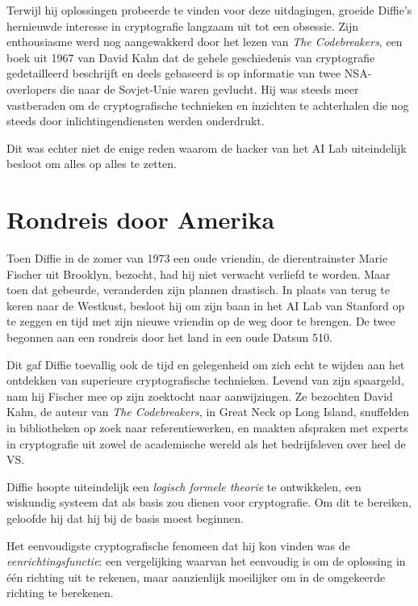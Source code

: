 \documentclass[
  a5paper,
  smalldemyvopaper,11pt,twoside,onecolumn,openright,extrafontsizes]{memoir}
\begin{document}
Terwijl hij oplossingen probeerde te vinden voor deze uitdagingen,
groeide Diffie's hernieuwde interesse in cryptografie langzaam uit tot
een obsessie. Zijn enthousiasme werd nog aangewakkerd door het lezen van
\emph{The Codebreakers}, een boek uit 1967 van David Kahn dat de gehele
geschiedenis van cryptografie gedetailleerd beschrijft en deels
gebaseerd is op informatie van twee NSA-overlopers die naar de
Sovjet-Unie waren gevlucht. Hij was steeds meer vastberaden om de
cryptografische technieken en inzichten te achterhalen die nog steeds
door inlichtingendiensten werden onderdrukt.

Dit was echter niet de enige reden waarom de hacker van het AI Lab
uiteindelijk besloot om alles op alles te zetten.

\section{Rondreis door Amerika}\label{rondreis-door-amerika}

Toen Diffie in de zomer van 1973 een oude vriendin, de dierentrainster
Marie Fischer uit Brooklyn, bezocht, had hij niet verwacht verliefd te
worden. Maar toen dat gebeurde, veranderden zijn plannen drastisch. In
plaats van terug te keren naar de Westkust, besloot hij om zijn baan in
het AI Lab van Stanford op te zeggen en tijd met zijn nieuwe vriendin op
de weg door te brengen. De twee begonnen aan een rondreis door het land
in een oude Datsun 510.

Dit gaf Diffie toevallig ook de tijd en gelegenheid om zich echt te
wijden aan het ontdekken van superieure cryptografische technieken.
Levend van zijn spaargeld, nam hij Fischer mee op zijn zoektocht naar
aanwijzingen. Ze bezochten David Kahn, de auteur van \emph{The
Codebreakers}, in Great Neck op Long Island, snuffelden in bibliotheken
op zoek naar referentiewerken, en maakten afspraken met experts in
cryptografie uit zowel de academische wereld als het bedrijfsleven over
heel de VS.

Diffie hoopte uiteindelijk een \emph{logisch formele theorie} te
ontwikkelen, een wiskundig systeem dat als basis zou dienen voor
cryptografie. Om dit te bereiken, geloofde hij dat hij bij de basis
moest beginnen.

Het eenvoudigste cryptografische fenomeen dat hij kon vinden was de
\emph{eenrichtingsfunctie}: een vergelijking waarvan het eenvoudig is om
de oplossing in één richting uit te rekenen, maar aanzienlijk moeilijker
om in de omgekeerde richting te berekenen.
\end{document}
